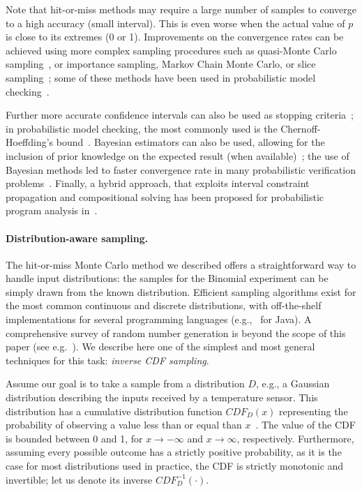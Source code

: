 Note that hit-or-miss methods may require a large number of samples to converge to a high accuracy (small interval). This is even worse when the actual value of $p$ is close to its extremes (0 or 1). Improvements on the convergence rates can be achieved using more complex sampling procedures such as quasi-Monte Carlo sampling~\cite{robert2013monte}, or importance sampling, Markov Chain Monte Carlo, or slice sampling~\cite{bishop2006pattern}; some of these methods have been used in probabilistic model checking~\cite{importanceSamplingSMC,splittingSMC,statisticalModelChecking}. 

Further more accurate confidence intervals can also be used as stopping criteria~\cite{pestman1998mathematical}; in probabilistic model checking, the most commonly used is the Chernoff-Hoeffding's bound~\cite{hoeffding1963probability,approximatePMC,statisticalModelChecking}. Bayesian estimators can also be used, allowing for the inclusion of prior knowledge on the expected result (when available)~\cite{Robert2007BayesianChoice,gelman2003bayesian}; the use of Bayesian methods led to faster convergence rate in many probabilistic verification problems~\cite{Zuliani:2010:BSM:1755952.1755987}. Finally, a hybrid approach, that  exploits interval constraint propagation and compositional solving has been proposed for probabilistic program analysis in~\cite{Borges2014,2015-fse-qcoral}.

\paragraph{Distribution-aware sampling.} The hit-or-miss Monte Carlo method we described offers a straightforward way to handle input distributions: the samples for the Binomial experiment can be simply drawn from the known distribution.
Efficient sampling algorithms exist for the most common continuous and discrete distributions, with off-the-shelf implementations for several programming languages (e.g.,~\cite{commonsMath3} for Java). A comprehensive survey of random number generation is beyond the scope of this paper (see e.g.~\cite{gentle2013random}). 
We describe here one of the simplest and most general techniques for this task: \emph{inverse CDF sampling}.


Assume our goal is to take a sample from a distribution $D$, e.g., a Gaussian distribution describing the inputs received by a temperature sensor. This distribution has a cumulative distribution function $CDF_D(x)$ representing the probability of observing a value less than or equal than $x$~\cite{pestman1998mathematical}. The value of the CDF is bounded between 0 and 1, for $x\to -\infty$ and $x \to \infty$, respectively. Furthermore, assuming every possible outcome has a strictly positive probability, as it is the case for most distributions used in practice, the CDF is strictly monotonic and invertible; let us denote its inverse $CDF_D^{-1}(\cdot)$. 

